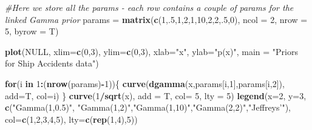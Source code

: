 \documentclass[]{article}
\newenvironment{Shaded}{\begin{snugshade}}{\end{snugshade}}
\newcommand{\KeywordTok}[1]{\textcolor[rgb]{0.13,0.29,0.53}{\textbf{#1}}}
\newcommand{\DataTypeTok}[1]{\textcolor[rgb]{0.13,0.29,0.53}{#1}}
\newcommand{\DecValTok}[1]{\textcolor[rgb]{0.00,0.00,0.81}{#1}}
\newcommand{\StringTok}[1]{\textcolor[rgb]{0.31,0.60,0.02}{#1}}
\newcommand{\CommentTok}[1]{\textcolor[rgb]{0.56,0.35,0.01}{\textit{#1}}}
\newcommand{\OtherTok}[1]{\textcolor[rgb]{0.56,0.35,0.01}{#1}}
\newcommand{\ControlFlowTok}[1]{\textcolor[rgb]{0.13,0.29,0.53}{\textbf{#1}}}
\newcommand{\OperatorTok}[1]{\textcolor[rgb]{0.81,0.36,0.00}{\textbf{#1}}}
\newcommand{\NormalTok}[1]{#1}
\begin{document}
\begin{Shaded}
\begin{Highlighting}[]
\CommentTok{#Here we store all the params - each row contains a couple of params for the linked Gamma prior}
\NormalTok{params =}\StringTok{ }\KeywordTok{matrix}\NormalTok{(}\KeywordTok{c}\NormalTok{(}\DecValTok{1}\NormalTok{,.}\DecValTok{5}\NormalTok{,}\DecValTok{1}\NormalTok{,}\DecValTok{2}\NormalTok{,}\DecValTok{1}\NormalTok{,}\DecValTok{10}\NormalTok{,}\DecValTok{2}\NormalTok{,}\DecValTok{2}\NormalTok{,.}\DecValTok{5}\NormalTok{,}\DecValTok{0}\NormalTok{), }\DataTypeTok{ncol =} \DecValTok{2}\NormalTok{, }\DataTypeTok{nrow =} \DecValTok{5}\NormalTok{, }\DataTypeTok{byrow =}\NormalTok{ T)}

\KeywordTok{plot}\NormalTok{(}\OtherTok{NULL}\NormalTok{, }\DataTypeTok{xlim=}\KeywordTok{c}\NormalTok{(}\DecValTok{0}\NormalTok{,}\DecValTok{3}\NormalTok{), }\DataTypeTok{ylim=}\KeywordTok{c}\NormalTok{(}\DecValTok{0}\NormalTok{,}\DecValTok{3}\NormalTok{), }\DataTypeTok{xlab=}\StringTok{"x"}\NormalTok{, }\DataTypeTok{ylab=}\StringTok{"p(x)"}\NormalTok{, }\DataTypeTok{main =} \StringTok{"Priors for Ship Accidents data"}\NormalTok{)}

\ControlFlowTok{for}\NormalTok{(i }\ControlFlowTok{in} \DecValTok{1}\OperatorTok{:}\NormalTok{(}\KeywordTok{nrow}\NormalTok{(params)}\OperatorTok{-}\DecValTok{1}\NormalTok{))\{}
  \KeywordTok{curve}\NormalTok{(}\KeywordTok{dgamma}\NormalTok{(x,params[i,}\DecValTok{1}\NormalTok{],params[i,}\DecValTok{2}\NormalTok{]), }\DataTypeTok{add=}\NormalTok{T, }\DataTypeTok{col=}\NormalTok{i)  }
\NormalTok{\}}
\KeywordTok{curve}\NormalTok{(}\DecValTok{1}\OperatorTok{/}\KeywordTok{sqrt}\NormalTok{(x), }\DataTypeTok{add =}\NormalTok{ T, }\DataTypeTok{col=} \DecValTok{5}\NormalTok{, }\DataTypeTok{lty =} \DecValTok{5}\NormalTok{)}
\KeywordTok{legend}\NormalTok{(}\DataTypeTok{x=}\DecValTok{2}\NormalTok{, }\DataTypeTok{y=}\DecValTok{3}\NormalTok{, }\KeywordTok{c}\NormalTok{(}\StringTok{"Gamma(1,0.5)"}\NormalTok{, }\StringTok{"Gamma(1,2)"}\NormalTok{,}\StringTok{"Gamma(1,10)"}\NormalTok{,}\StringTok{"Gamma(2,2)"}\NormalTok{,}\StringTok{"Jeffreys'"}\NormalTok{), }\DataTypeTok{col=}\KeywordTok{c}\NormalTok{(}\DecValTok{1}\NormalTok{,}\DecValTok{2}\NormalTok{,}\DecValTok{3}\NormalTok{,}\DecValTok{4}\NormalTok{,}\DecValTok{5}\NormalTok{), }\DataTypeTok{lty=}\KeywordTok{c}\NormalTok{(}\KeywordTok{rep}\NormalTok{(}\DecValTok{1}\NormalTok{,}\DecValTok{4}\NormalTok{),}\DecValTok{5}\NormalTok{))}
\end{Highlighting}
\end{Shaded}
\end{document}
